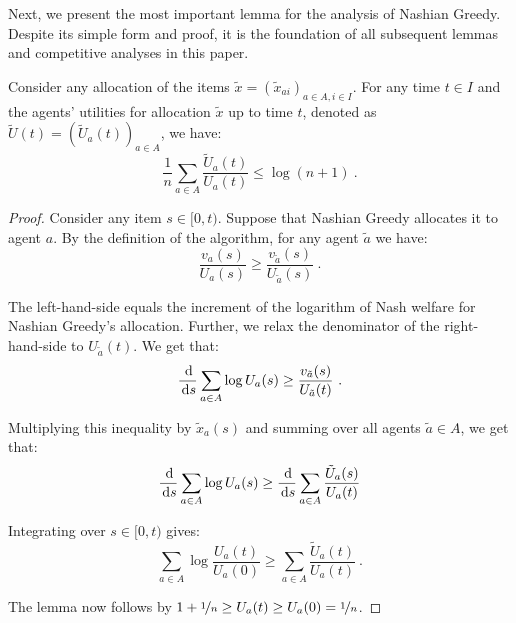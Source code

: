 \documentclass[11pt,letterpaper]{article}
\newcommand{\dif}[1]{\,\text{\rm d} #1}
\newcommand{\utility}{U}
\begin{document}
Next, we present the most important lemma for the analysis of Nashian Greedy.
Despite its simple form and proof, it is the foundation of all subsequent lemmas and competitive analyses in this paper.



\begin{lemma}
	\label{lem:nashian}
	Consider any allocation of the items $\tilde{x} = (\tilde{x}_{ai})_{a \in A, i \in I}$.
	For any time $t \in I$ and the agents' utilities for allocation $\tilde{x}$ up to time $t$, denoted as $\tilde{\utility}(t) = (\tilde{\utility}_a(t))_{a \in A}$, we have:
	\[
		\frac{1}{n} \sum_{a \in A} \frac{\tilde{\utility}_a(t)}{\utility_a(t)} \le \log (n+1)
		~.
	\]
\end{lemma}

\begin{proof}
	Consider any item $s \in [0, t)$.
	Suppose that Nashian Greedy allocates it to agent $a$.
	By the definition of the algorithm, for any agent $\tilde{a}$ we have:
	\[
		\frac{v_a(s)}{\utility_a(s)} \ge \frac{v_{\tilde{a}}(s)}{\utility_{\tilde{a}}(s)}
		~.
	\]
	
	The left-hand-side equals the increment of the logarithm of Nash  welfare for Nashian Greedy's allocation.
	Further, we relax the denominator of the right-hand-side to $U_{\tilde{a}}(t)$.
	We get that:
	\[
		\frac{\dif}{\dif{s}} \sum_{a \in A} \log \utility_a(s) \ge \frac{v_{\tilde{a}}(s)}{\utility_{\tilde{a}}(t)}
		~.
	\]
	
	Multiplying this inequality by $\tilde{x}_a(s)$ and summing over all agents $\tilde{a} \in A$, we get that:
	\[
		\frac{\dif}{\dif{s}} \sum_{a \in A} \log \utility_a(s)  \ge \frac{\dif}{\dif{s}} \sum_{a\in A} \frac{\tilde{\utility}_a(s)}{\utility_a(t)}
	\]
	
	Integrating over $s \in [0, t)$ gives:
	\[
		\sum_{a \in A} \log \frac{\utility_a(t)}{\utility_a(0)} \ge \sum_{a \in A} \frac{\tilde{\utility}_a(t)}{\utility_a(t)} 
		~.
	\]
	
	The lemma now follows by $1+\nicefrac{1}{n} \ge \utility_a(t) \ge \utility_a(0) = \nicefrac{1}{n}$.
\end{proof}
\end{document}
